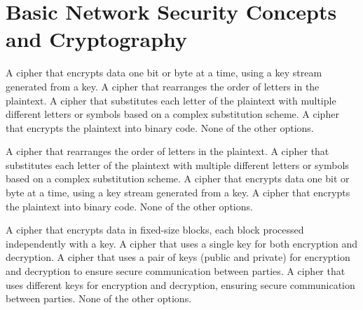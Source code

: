 \section{Basic Network Security
Concepts and Cryptography}

\begin{checkboxes}
    \CorrectChoice A cipher that encrypts data one bit or byte at a time, using a key stream generated from a key.
    \choice A cipher that rearranges the order of letters in the plaintext.
    \choice A cipher that substitutes each letter of the plaintext with multiple different letters or symbols based on a complex substitution scheme.
    \choice A cipher that encrypts the plaintext into binary code.
    \choice None of the other options.
\end{checkboxes}

\begin{checkboxes}
    \choice A cipher that rearranges the order of letters in the plaintext.
    \choice A cipher that substitutes each letter of the plaintext with multiple different letters or symbols based on a complex substitution scheme.
    \choice A cipher that encrypts data one bit or byte at a time, using a key stream generated from a key.
    \choice A cipher that encrypts the plaintext into binary code.
    \CorrectChoice None of the other options.
\end{checkboxes}




\begin{checkboxes}
    \choice A cipher that encrypts data in fixed-size blocks, each block processed independently with a key.
    \choice A cipher that uses a single key for both encryption and decryption.
    \CorrectChoice A cipher that uses a pair of keys (public and private) for encryption and decryption to ensure secure communication between parties.
    \CorrectChoice A cipher that uses different keys for encryption and decryption, ensuring secure communication between parties.
    \choice None of the other options.
\end{checkboxes}


